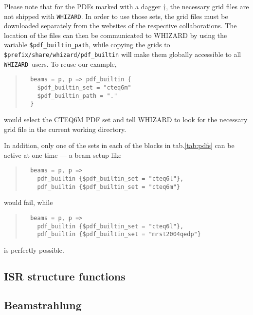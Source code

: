 \documentclass[12pt]{book}
\newcommand{\whizard}{\texttt{WHIZARD}}
\begin{document}
Please note that for the PDFs marked with a dagger $\dagger$, the necessary grid
files are not shipped with \whizard. In order to use those sets, the grid files
must be downloaded separately from the websites of the respective collaborations.
The location of the files can then be communicated to WHIZARD by using the
variable \verb?$pdf_builtin_path?, while
copying the grids to \verb?$prefix/share/whizard/pdf_builtin? will make them
globally accessible to all \whizard\ users. To reuse our example, 
%
\begin{quote}
\begin{footnotesize}
\begin{verbatim}
  beams = p, p => pdf_builtin {
    $pdf_builtin_set = "cteq6m"
    $pdf_builtin_path = "."
  }
\end{verbatim}
\end{footnotesize}
\end{quote}
%
would select the CTEQ6M PDF set and tell WHIZARD to look for the necessary grid
file in the current working directory.

In addition, only one of the sets in each of the blocks in tab.\ref{tab:pdfs}
can be active at one time --- a beam setup like
%
\begin{quote}
\begin{footnotesize}
\begin{verbatim}
  beams = p, p =>
    pdf_builtin {$pdf_builtin_set = "cteq6l"},
    pdf_builtin {$pdf_builtin_set = "cteq6m"}
\end{verbatim}
\end{footnotesize}
\end{quote}
%
would fail, while
\begin{quote}
\begin{footnotesize}
\begin{verbatim}
  beams = p, p =>
    pdf_builtin {$pdf_builtin_set = "cteq6l"},
    pdf_builtin {$pdf_builtin_set = "mrst2004qedp"}
\end{verbatim}
\end{footnotesize}
\end{quote}
%
is perfectly possible.

\subsection{ISR structure functions}

\subsection{Beamstrahlung}
\end{document}

